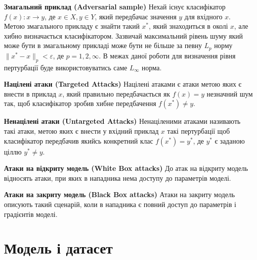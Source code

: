 \documentclass[a4paper,14pt]{extreport}
\begin{document}
	\textbf{Змагальний приклад (Adversarial sample)}
	\newline
	Нехай існує класифікатор $f(x):x\rightarrow y$, де  $x \in X, y \in Y$, який передбачає значення $y$ для вхідного $x$. Метою змагального прикладу є знайти такий $x^{*}$, який знаходиться в околі $x$, але хибно визначається класифікатором. Зазвичай максимальний рівень шуму який може бути в змагальному прикладі може бути не більше за певну $L_p$ норму $ \| x^{*} - x \|_p < \varepsilon $, де $p=1,2,\infty $. В межах даної роботи для визначення рівня пертурбації буде використовуватись саме $L_{\infty}$ норма.
	\par
	\textbf{Націлені атаки (Targeted Attacks)} \newline
	Націлені атаками є атаки метою яких є внести в приклад $x$, який правильно передбачається як $f(x) = y$ незначний шум так, щоб класифікатор зробив хибне передбачення $f(x^{*}) \neq y$.
	\par
	\textbf{Ненацілені атаки (Untargeted Attacks)} \newline
	Ненаціленими атаками називають такі атаки, метою яких є внести у вхідний приклад $x$ такі пертурбації щоб класифікатор передбачив якийсь конкретний клас $f(x^{*}) = y^{*}$, де $y^{*}$ є заданою ціллю $y^{*} \neq y$.
	\par
	\textbf{Атаки на відкриту модель (White Box attacks)} \newline
	До атак на відкриту модель відносять атаки, при яких в нападника нема доступу до параметрів моделі. 
	\par
	\textbf{Атаки на закриту модель (Black Box attacks)} \newline
	Атаки на закриту модель описують такий сценарій, коли в нападника є повний доступ до параметрів і градієнтів моделі.

	\chapter{Модель і датасет}
	
\end{document}
